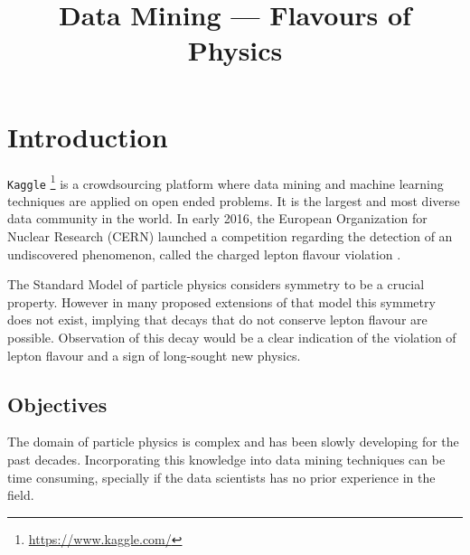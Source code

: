 \documentclass[conference]{IEEEtran}
\begin{document}
\title{Data Mining --- Flavours of Physics}

\author{

}

\maketitle


\begin{abstract}
\end{abstract}


\IEEEpeerreviewmaketitle%


\section{Introduction}
\label{sec:intro}
\texttt{Kaggle} \footnote{\url{https://www.kaggle.com/}} is a crowdsourcing platform where data mining and machine learning techniques are applied on open ended problems. It is the largest and most diverse data community in the world. In early 2016, the European Organization for Nuclear Research (CERN) launched a competition regarding the detection of an undiscovered phenomenon, called the charged lepton flavour violation \cite{hirsch2011charged}.

The Standard Model of particle physics considers symmetry to be a crucial property. However in many proposed extensions of that model this symmetry does not exist, implying that decays that do not conserve lepton flavour are possible. Observation of this decay would be a clear indication of the violation of lepton flavour and a sign of long-sought new physics.

\subsection{Objectives}
The domain of particle physics is complex and has been slowly developing for the past decades. Incorporating this knowledge into data mining techniques can be time consuming, specially if the data scientists has no prior experience in the field.

\end{document}
